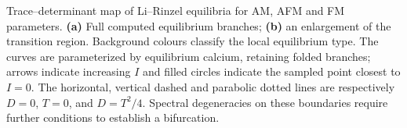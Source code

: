 Trace--determinant map of Li--Rinzel equilibria for AM, AFM and FM parameters. \textbf{(a)} Full computed equilibrium branches; \textbf{(b)} an enlargement of the transition region. Background colours classify the local equilibrium type. The curves are parameterized by equilibrium calcium, retaining folded branches; arrows indicate increasing $I$ and filled circles indicate the sampled point closest to $I=0$. The horizontal, vertical dashed and parabolic dotted lines are respectively $D=0$, $T=0$, and $D=T^2/4$. Spectral degeneracies on these boundaries require further conditions to establish a bifurcation.
